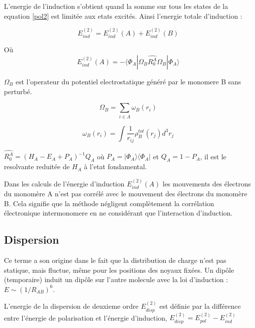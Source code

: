 L'energie de l'induction s'obtient quand la somme sur tous les states de la equation \ref{pol2} est limitée aux etats excités. Ainsi l'energie totale d'induction : 

\begin{equation}
E_{ind}^{(2)} = E_{ind}^{(2)}(A) + E_{ind}^{(2)}(B) \label{ind}
\end{equation}
		
Où  \begin{equation}
E_{ind}^{(2)}(A) = -\langle \Phi_{A}|\Omega_{B}\hat{R_{0}^{A}}\Omega_{B}| \Phi_{A} \rangle  \label{indA}
\end{equation}		

$\Omega_{B}$ est l'operateur du potentiel electrostatique généré par le monomere B sans perturbé. 

\begin{equation}
\Omega_{B} = \sum_{i\in A} \omega_{B}(r_{i})
\end{equation}

\begin{equation}
\omega_{B}(r_{i}) = \int \frac{1}{r_{ij}} \rho_{B}^{tot}(r_{j}) d^{3}r_{j}
\end{equation}

$\hat{R_{0}^{A}} = (H_{A}- E_{A} + P_{A})^{-1}Q_{A}$ où $P_{A} = |\Phi_{A}\rangle \langle \Phi_{A}|$ et $Q_{A} = 1- P_{A}$, il est le resolvante reduitée de $H_{A}$ à l'etat fondamental. 


Dans les calculs de l'énergie d'induction $E_{ind}^{(2)}(A)$ les mouvements des électrons du monomère A n'est pas corrélé avec le mouvement des électrons du monomère B. Cela signifie que la méthode négligent complètement la corrélation électronique intermonomere en ne considérant que l'interaction d'induction.  

\subsection{Dispersion}

Ce terme a son origine dans le fait que la distribution de charge n'est pas statique, mais fluctue, même pour les positions des noyaux fixées. Un dipôle (temporaire) induit un dipôle sur l'autre molecule avec la loi d'induction : $E\sim (1/R_{AB})^{6}$.

L'energie de la dispersion de deuxieme ordre $E_{disp}^{(2)}$ est définie par la différence entre l'énergie de polarisation et l'énergie d'induction, $E_{disp}^{(2)} = E_{pol}^{(2)} - E_{ind}^{(2)}$
	
